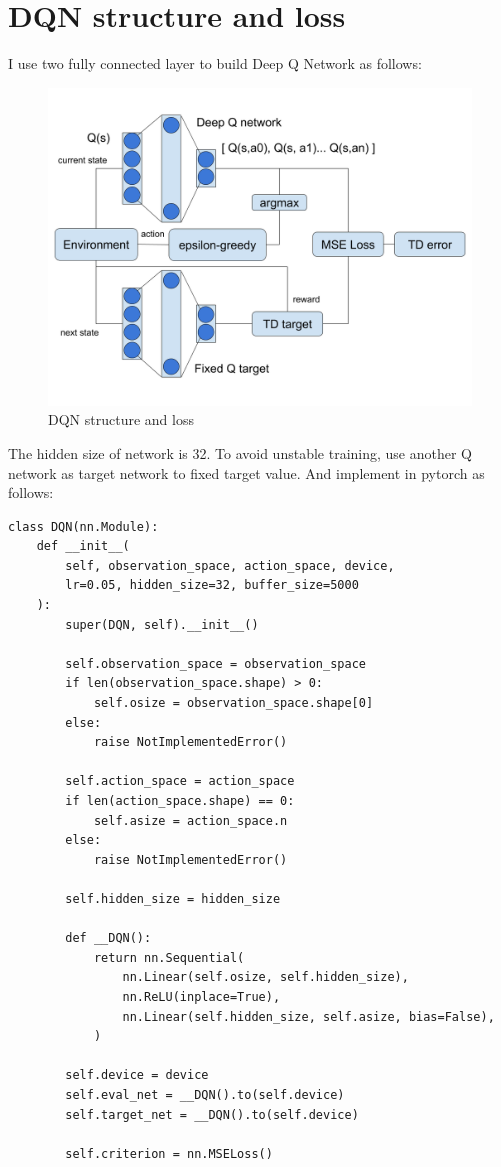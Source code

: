 \documentclass[12pt]{article}
\begin{document}
\section{DQN structure and loss}

I use two fully connected layer to build Deep Q Network as follows:

\begin{figure}[H]
\centering
\includegraphics[width=\linewidth]{Images/dqn-arch.png} 
\caption{DQN structure and loss}
\end{figure}

The hidden size of network is 32. To avoid unstable training, use another Q network as target network to fixed target value. And implement in pytorch as follows:

\begin{verbatim}
class DQN(nn.Module):
    def __init__(
        self, observation_space, action_space, device,
        lr=0.05, hidden_size=32, buffer_size=5000
    ):
        super(DQN, self).__init__()
        
        self.observation_space = observation_space
        if len(observation_space.shape) > 0:
            self.osize = observation_space.shape[0]
        else:
            raise NotImplementedError()
        
        self.action_space = action_space
        if len(action_space.shape) == 0:
            self.asize = action_space.n
        else:
            raise NotImplementedError()
        
        self.hidden_size = hidden_size
        
        def __DQN():
            return nn.Sequential(
                nn.Linear(self.osize, self.hidden_size),
                nn.ReLU(inplace=True),
                nn.Linear(self.hidden_size, self.asize, bias=False),
            )
        
        self.device = device
        self.eval_net = __DQN().to(self.device)
        self.target_net = __DQN().to(self.device)
        
        self.criterion = nn.MSELoss()
\end{verbatim}
\end{document}

